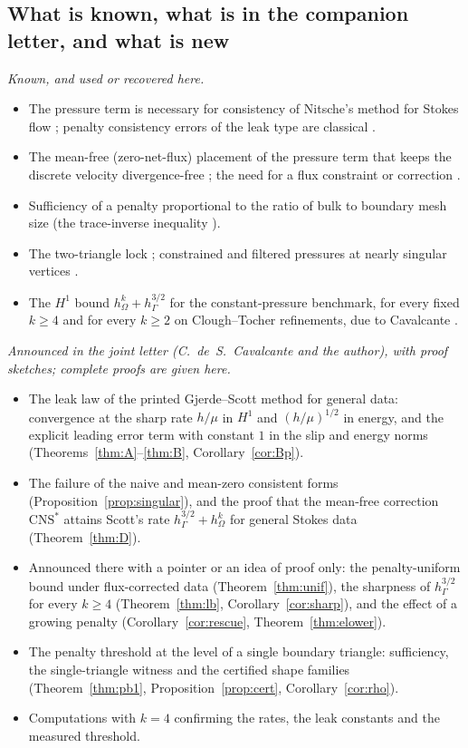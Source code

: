 \documentclass[pdflatex,sn-mathphys-num]{sn-jnl}
\theoremstyle{thmstyleone}
\theoremstyle{thmstylethree}
\newcommand{\hG}{h_\Gamma}
\newcommand{\hO}{h_\Omega}
\newcommand{\CNS}{\mathrm{CNS}^\ast}
\begin{document}
\subsection{What is known, what is in the companion letter, and what is new}\label{sec:knownnew}
\emph{Known, and used or recovered here.}
\begin{itemize}
\item The pressure term is necessary for consistency of Nitsche's method for Stokes flow \cite{BurmanHansboLarson2019Stokes}; penalty consistency errors of the leak type are classical \cite{Babuska1973}.
\item The mean-free (zero-net-flux) placement of the pressure term that keeps the discrete velocity divergence-free \cite{FrachonNilssonZahedi2024}; the need for a flux constraint or correction \cite{LiuNeilanOtus2023,EickmannScottTscherpel2025}.
\item Sufficiency of a penalty proportional to the ratio of bulk to boundary mesh size (the trace-inverse inequality \cite{Stenberg1995,JuntunenStenberg2009}).
\item The two-triangle lock \cite{ScottPrize,GjerdeScott2024}; constrained and filtered pressures at nearly singular vertices \cite{GrassleBohneSauter2024,Park2020,BohneGrassleSauter2025}.
\item The $H^1$ bound $\hO^k+\hG^{3/2}$ for the constant-pressure benchmark, for every fixed $k\ge4$ and for every $k\ge2$ on Clough--Tocher refinements, due to Cavalcante \cite[Thm.~5.2, Cor.~5.3]{Cavalcante}.
\end{itemize}
\emph{Announced in the joint letter \cite{CavalcantePadhiLetter} (C.~de~S.~Cavalcante and the author), with proof sketches; complete proofs are given here.}
\begin{itemize}
\item The leak law of the printed Gjerde--Scott method for general data: convergence at the sharp rate $h/\mu$ in $H^1$ and $(h/\mu)^{1/2}$ in energy, and the explicit leading error term with constant $1$ in the slip and energy norms (Theorems~\ref{thm:A}--\ref{thm:B}, Corollary~\ref{cor:Bp}).
\item The failure of the naive and mean-zero consistent forms (Proposition~\ref{prop:singular}), and the proof that the mean-free correction $\CNS$ attains Scott's rate $\hG^{3/2}+\hO^k$ for general Stokes data (Theorem~\ref{thm:D}).
\item Announced there with a pointer or an idea of proof only: the penalty-uniform bound under flux-corrected data (Theorem~\ref{thm:unif}), the sharpness of $\hG^{3/2}$ for every $k\ge4$ (Theorem~\ref{thm:lb}, Corollary~\ref{cor:sharp}), and the effect of a growing penalty (Corollary~\ref{cor:rescue}, Theorem~\ref{thm:elower}).
\item The penalty threshold at the level of a single boundary triangle: sufficiency, the single-triangle witness and the certified shape families (Theorem~\ref{thm:pb1}, Proposition~\ref{prop:cert}, Corollary~\ref{cor:rho}).
\item Computations with $k=4$ confirming the rates, the leak constants and the measured threshold.
\end{itemize}
\end{document}
